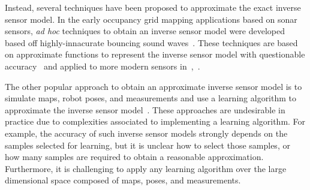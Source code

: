 \documentclass[letterpaper, 10pt, conference]{ieeeconf}
\begin{document}
Instead, several techniques have been proposed to approximate the exact inverse sensor model. %
In the early occupancy grid mapping applications based on sonar sensors, \emph{ad hoc} techniques to obtain an inverse sensor model were developed based off highly-innacurate bouncing sound waves~\cite{MorElf85,Elf89}.
These techniques are based on approximate functions to represent the inverse sensor model with questionable accuracy~\cite{ChoLynHutKanBurKavThr05} and applied to more modern sensors in~\cite{And09},~\cite{PirRutBisSch11}.

The other popular approach to obtain an approximate inverse sensor model is to simulate maps, robot poses, and measurements and use a learning algorithm to approximate the inverse sensor model~\cite{ThrBurFox05,Thr01}. These approaches are undesirable in practice due to complexities associated to implementing a learning algorithm. For example, the accuracy of such inverse sensor models strongly depends on the samples selected for learning, but it is unclear how to select those samples, or how many samples are required to obtain a reasonable approximation. Furthermore, it is challenging to apply any learning algorithm over the large dimensional space composed of maps, poses, and measurements. 




\end{document}
